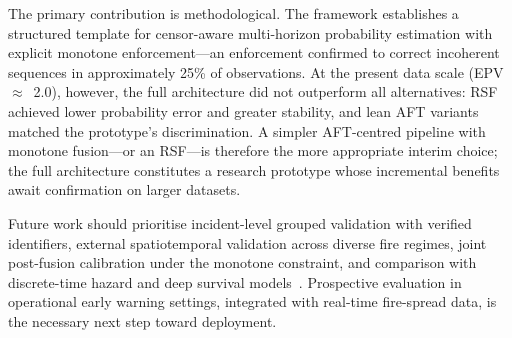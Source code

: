 \documentclass[fire,article,submit,pdftex]{../Definitions/mdpi}
\begin{document}
The primary contribution is methodological.
The framework establishes a structured template for censor-aware multi-horizon probability estimation with explicit monotone enforcement---an enforcement confirmed to correct incoherent sequences in approximately 25\% of observations.
At the present data scale (EPV~$\approx$~2.0), however, the full architecture did not outperform all alternatives: RSF achieved lower probability error and greater stability, and lean AFT variants matched the prototype's discrimination.
A simpler AFT-centred pipeline with monotone fusion---or an RSF---is therefore the more appropriate interim choice; the full architecture constitutes a research prototype whose incremental benefits await confirmation on larger datasets.

Future work should prioritise incident-level grouped validation with verified identifiers, external spatiotemporal validation across diverse fire regimes, joint post-fusion calibration under the monotone constraint, and comparison with discrete-time hazard and deep survival models~\cite{Katzman2018}.
Prospective evaluation in operational early warning settings, integrated with real-time fire-spread data, is the necessary next step toward deployment.

\vspace{6pt}
\end{document}
